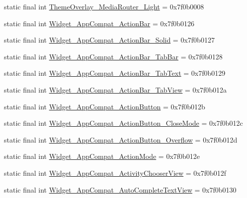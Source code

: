 \begin{CompactItemize}
\item 
static final int \hyperlink{classandroid_1_1support_1_1transition_1_1_r_1_1style_4c26e9e1e3b0871708680782df1a6384}{ThemeOverlay\_\-MediaRouter\_\-Light} = 0x7f0b0008
\item 
static final int \hyperlink{classandroid_1_1support_1_1transition_1_1_r_1_1style_301ab27c75f58b996a960f79c15146d7}{Widget\_\-AppCompat\_\-ActionBar} = 0x7f0b0126
\item 
static final int \hyperlink{classandroid_1_1support_1_1transition_1_1_r_1_1style_c63b1c48da87e248c7ffd1a18a8657a1}{Widget\_\-AppCompat\_\-ActionBar\_\-Solid} = 0x7f0b0127
\item 
static final int \hyperlink{classandroid_1_1support_1_1transition_1_1_r_1_1style_63ee55e99e2b49282388db1139f9504b}{Widget\_\-AppCompat\_\-ActionBar\_\-TabBar} = 0x7f0b0128
\item 
static final int \hyperlink{classandroid_1_1support_1_1transition_1_1_r_1_1style_9b28be3f18f808bf15fcace76f22884a}{Widget\_\-AppCompat\_\-ActionBar\_\-TabText} = 0x7f0b0129
\item 
static final int \hyperlink{classandroid_1_1support_1_1transition_1_1_r_1_1style_5aec0f28de2687cf1c9925fb3a753f91}{Widget\_\-AppCompat\_\-ActionBar\_\-TabView} = 0x7f0b012a
\item 
static final int \hyperlink{classandroid_1_1support_1_1transition_1_1_r_1_1style_4fa1f8ffc741621981915cabfb9dfd51}{Widget\_\-AppCompat\_\-ActionButton} = 0x7f0b012b
\item 
static final int \hyperlink{classandroid_1_1support_1_1transition_1_1_r_1_1style_8a2456a8c6de8903cf0d30cbfbcd44be}{Widget\_\-AppCompat\_\-ActionButton\_\-CloseMode} = 0x7f0b012c
\item 
static final int \hyperlink{classandroid_1_1support_1_1transition_1_1_r_1_1style_46f0312bc586bdd609eb425165c319cf}{Widget\_\-AppCompat\_\-ActionButton\_\-Overflow} = 0x7f0b012d
\item 
static final int \hyperlink{classandroid_1_1support_1_1transition_1_1_r_1_1style_141e4e4942a47acf68c237dfd21d00a2}{Widget\_\-AppCompat\_\-ActionMode} = 0x7f0b012e
\item 
static final int \hyperlink{classandroid_1_1support_1_1transition_1_1_r_1_1style_0fbfaf7d83d7aa38dee02e94a9898980}{Widget\_\-AppCompat\_\-ActivityChooserView} = 0x7f0b012f
\item 
static final int \hyperlink{classandroid_1_1support_1_1transition_1_1_r_1_1style_7bdf0a7d9f2ead04dad8c51c4b2b9977}{Widget\_\-AppCompat\_\-AutoCompleteTextView} = 0x7f0b0130

\end{CompactItemize}
